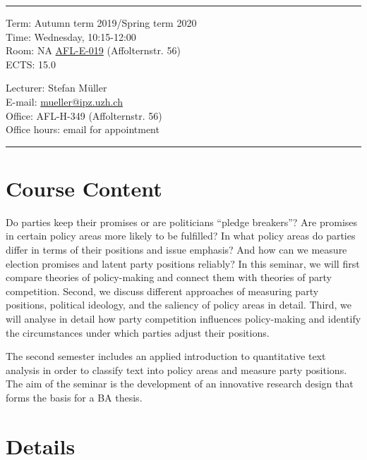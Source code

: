 \documentclass[abstract=on,parskip=full,headings=standardclasses,fontsize=11pt,paper=a4]{scrartcl}
\begin{document}
\hrule
\medskip
\begin{minipage}[t]{0.5\textwidth}
Term: Autumn term 2019/Spring term 2020 \\
Time: Wednesday, 10:15-12:00 \\
Room: NA  \href{https://www.plaene.uzh.ch/AFL}{AFL-E-019} (Affolternstr. 56) \\
ECTS: 15.0
\end{minipage}
\begin{minipage}[t]{0.49\textwidth}
\begin{flushright}
Lecturer: Stefan Müller \\
E-mail: \href{mailto:mueller@ipz.uzh.ch}{\textsf{mueller@ipz.uzh.ch}} \\
Office:  AFL-H-349 (Affolternstr. 56) \\
Office hours: email for appointment \\
\end{flushright}
\end{minipage}
\medskip
\vspace{2.5mm}
\hrule 

\section*{Course Content}

Do parties keep their promises or are politicians ``pledge breakers''? Are promises in certain policy areas more likely to be fulfilled? In what policy areas do parties differ in terms of their positions and issue emphasis? And how can we measure election promises and latent party positions reliably? In this seminar, we will first compare theories of policy-making and connect them with theories of party competition. Second, we discuss different approaches of measuring party positions, political ideology, and the saliency of policy areas in detail. Third, we will analyse in detail how party competition influences policy-making and identify the circumstances under which parties adjust their positions.

The second semester includes an applied introduction to quantitative text analysis in order to classify text into policy areas and measure party positions. The aim of the seminar is the development of an innovative research design that forms the basis for a BA thesis.


\section*{Details}
\end{document}
